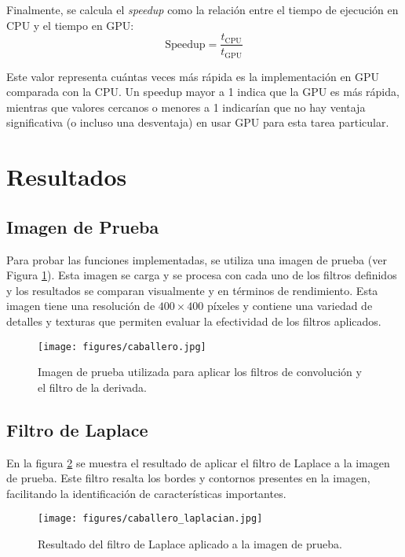 \documentclass{pas}
\begin{document}
Finalmente, se calcula el \emph{speedup} como la relación entre el tiempo de ejecución en CPU y el tiempo en GPU:
\[
\text{Speedup} = \frac{t_{\text{CPU}}}{t_{\text{GPU}}}
\]

Este valor representa cuántas veces más rápida es la implementación en GPU comparada con la CPU. Un speedup mayor a 1 indica que la GPU es más rápida, mientras que valores cercanos o menores a 1 indicarían que no hay ventaja significativa (o incluso una desventaja) en usar GPU para esta tarea particular.


\section{Resultados}

\subsection{Imagen de Prueba}
Para probar las funciones implementadas, se utiliza una imagen de prueba (ver Figura \ref{fig:prueba}). Esta imagen se carga y se procesa con cada uno de los filtros definidos y los resultados se comparan visualmente y en términos de rendimiento. Esta imagen tiene una resolución de $400 \times 400$ píxeles y contiene una variedad de detalles y texturas que permiten evaluar la efectividad de los filtros aplicados. 

\begin{figure}
    \centering
    \texttt{[image: figures/caballero.jpg]}
    \caption{Imagen de prueba utilizada para aplicar los filtros de convolución y el filtro de la derivada.}
    \label{fig:prueba}
\end{figure}

\subsection{Filtro de Laplace}
En la figura \ref{fig:laplace} se muestra el resultado de aplicar el filtro de Laplace a la imagen de prueba. Este filtro resalta los bordes y contornos presentes en la imagen, facilitando la identificación de características importantes.

\begin{figure}[H]
    \centering
    \texttt{[image: figures/caballero\_laplacian.jpg]}
    \caption{Resultado del filtro de Laplace aplicado a la imagen de prueba.}
    \label{fig:laplace}
\end{figure}
\end{document}
